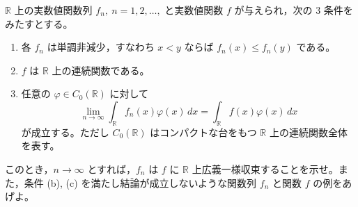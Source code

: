 \documentclass[12pt]{jlreq}
\newcommand{\R}{\mathbb{R}}
\newcommand{\dd}{\,d}
\begin{document}
\(\R\) 上の実数値関数列 \(f_n,\ n=1,2,\ldots,\) と実数値関数 \(f\) が与えられ，次の \(3\) 条件をみたすとする。

\begin{enumerate}
  \item[(a)] 各 \(f_n\) は単調非減少，すなわち \(x<y\) ならば \(f_n(x)\le f_n(y)\) である。
  \item[(b)] \(f\) は \(\R\) 上の連続関数である。
  \item[(c)] 任意の \(\varphi\in C_0(\R)\) に対して
  \[
    \lim_{n\to\infty}\int_{\R}f_n(x)\varphi(x)\dd x
    =\int_{\R}f(x)\varphi(x)\dd x
  \]
  が成立する。ただし \(C_0(\R)\) はコンパクトな台をもつ \(\R\) 上の連続関数全体を表す。
\end{enumerate}

このとき，\(n\to\infty\) とすれば，\(f_n\) は \(f\) に \(\R\) 上広義一様収束することを示せ。また，条件 (b), (c) を満たし結論が成立しないような関数列 \(f_n\) と関数 \(f\) の例をあげよ。
\end{document}
